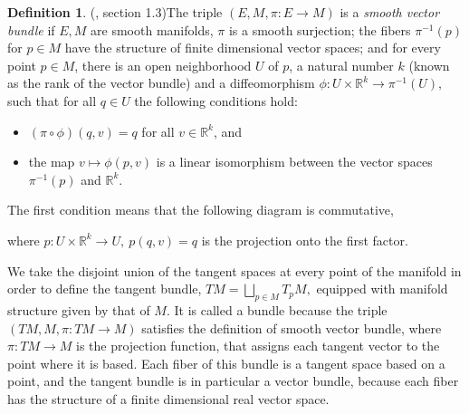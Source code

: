 \documentclass[12pt, letterpaper, reqno]{amsart}
\theoremstyle{definition}
\newtheorem{df}{Definition}
\theoremstyle{plain}
\theoremstyle{remark}
\begin{document}
\begin{df}(\cite{luke2013vector}, section 1.3)\label{def:smooth_vector_bundle}
	The triple $ (E, M, \pi: E \rightarrow {M}) $ is a \textit{smooth vector bundle} if $ E,M $ are smooth manifolds, $ \pi $ is a smooth surjection; the fibers $ \pi^{-1}(p) $ for $ p\in M $  have the structure of finite dimensional vector spaces; and for every point $ p\in M $, there is an open neighborhood $ U $ of $ p $, a natural number $ k $ (known as the rank of the vector bundle) and a diffeomorphism $ \phi: U\times \mathbb{R}^k \rightarrow  \pi^{-1}(U),$ such that for all $ q\in U $ the following conditions hold:  

	\begin{itemize}
		\item $ (\pi\circ \phi)(q,v)=q $ for all $ v\in \mathbb{R}^k $, and  
		\item the map $ v \mapsto \phi(p,v) $ is a linear isomorphism between the vector spaces $\pi^{-1}(p) $ and $ \mathbb{R}^k. $     
	\end{itemize}
	The first condition means that the following diagram is commutative,	
	\begin{center}
	\end{center}
	where $ p:U\times \mathbb{R}^k \rightarrow U, \ p(q,v)=q$ is the projection onto the first factor.
\end{df}
We take the disjoint union of the tangent spaces at every point of the manifold in order to define the tangent bundle,
$ TM = \bigsqcup_{p\in M} T_pM, $ 
equipped with manifold structure given by that of $ M. $ It is called a bundle because the triple $ (TM, M,\pi:TM \rightarrow {M}) $ satisfies the definition of smooth vector bundle, where $ \pi:TM \rightarrow {M} $  is the projection function, that assigns each tangent vector to the point where it is based. Each fiber of this bundle is a tangent space based on a point, and the tangent bundle is in particular a vector bundle, because each fiber has the structure of a finite dimensional real vector space.
\end{document}
